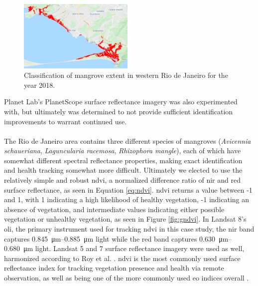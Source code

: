 \begin{figure}[H] 
\centering
\includegraphics[width=0.49\textwidth]{Figures/chap4/guaratiba_extent.png}
\caption[Classification of mangrove extent in western Rio de Janeiro for the year 2018]{Classification of mangrove extent in western Rio de Janeiro for the year 2018.}
\label{fig:gextent}
\end{figure}

Planet Lab's PlanetScope surface reflectance imagery was also experimented with, but ultimately was determined to not provide sufficient identification improvements to warrant continued use. 

\paragraph{} \label{sec:rio-magrove-health} \leavevmode\newline

The Rio de Janeiro area contains three different species of mangroves (\textit{Avicennia schaueriana}, \textit{Laguncularia racemosa}, \textit{Rhizophora mangle}), each of which have somewhat different spectral reflectance properties, making exact identification and health tracking somewhat more difficult. Ultimately we elected to use the relatively simple and robust \ac{ndvi}, a normalized difference ratio of \ac{nir} and red surface reflectance, as seen in Equation \ref{eq:ndvi}. \ac{ndvi} returns a value between -1 and 1, with 1 indicating a high likelihood of healthy vegetation, -1 indicating an absence of vegetation, and intermediate values indicating either possible vegetation or unhealthy vegetation, as seen in Figure \ref{fig:gndvi}. In Landsat 8's \ac{oli}, the primary instrument used for tracking \ac{ndvi} in this case study, the \ac{nir} band captures \SIrange{0.845}{0.885}{\micro\metre} light while the red band captures \SIrange{0.630}{0.680}{\micro\metre} light. Landsat 5 and 7 surface reflectance imagery were used as well, harmonized according to Roy et al. \cite{royCharacterizationLandsat7Landsat82016}. \ac{ndvi} is the most commonly used surface reflectance index for tracking vegetation presence and health via remote observation, as well as being one of the more commonly used \ac{eo} indices overall \cite{fredenMonitoringVegetationSystems1974,haboudaneHyperspectralVegetationIndices2004, pettorelliUsingSatellitederivedNDVI2005}. 

